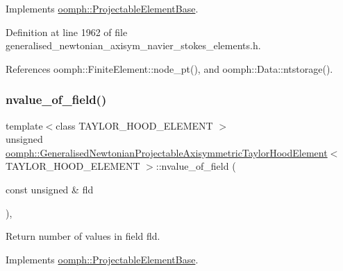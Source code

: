Implements \hyperlink{classoomph_1_1ProjectableElementBase_ac6790f394630b964663281f8740f43a5}{oomph\+::\+Projectable\+Element\+Base}.



Definition at line 1962 of file generalised\+\_\+newtonian\+\_\+axisym\+\_\+navier\+\_\+stokes\+\_\+elements.\+h.



References oomph\+::\+Finite\+Element\+::node\+\_\+pt(), and oomph\+::\+Data\+::ntstorage().

\mbox{\label{classoomph_1_1GeneralisedNewtonianProjectableAxisymmetricTaylorHoodElement_a81ea5945349c6295624df0615ec76b82}} 
\subsubsection{\texorpdfstring{nvalue\+\_\+of\+\_\+field()}{nvalue\_of\_field()}}
{\footnotesize\ttfamily template$<$class T\+A\+Y\+L\+O\+R\+\_\+\+H\+O\+O\+D\+\_\+\+E\+L\+E\+M\+E\+NT $>$ \\
unsigned \hyperlink{classoomph_1_1GeneralisedNewtonianProjectableAxisymmetricTaylorHoodElement}{oomph\+::\+Generalised\+Newtonian\+Projectable\+Axisymmetric\+Taylor\+Hood\+Element}$<$ T\+A\+Y\+L\+O\+R\+\_\+\+H\+O\+O\+D\+\_\+\+E\+L\+E\+M\+E\+NT $>$\+::nvalue\+\_\+of\+\_\+field (\begin{DoxyParamCaption}\item[{const unsigned \&}]{fld }\end{DoxyParamCaption})\hspace{0.3cm}{\ttfamily [inline]}, {\ttfamily [virtual]}}



Return number of values in field fld. 



Implements \hyperlink{classoomph_1_1ProjectableElementBase_a1a9a6de16f3511bca8e8be770abb9c2e}{oomph\+::\+Projectable\+Element\+Base}.



